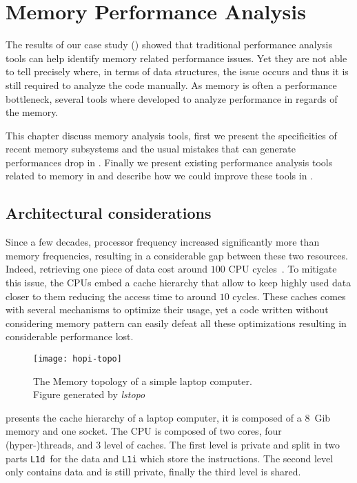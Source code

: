 \chapter{Memory Performance Analysis}

The results of our case study () showed that traditional performance analysis tools can help identify memory related performance issues.
Yet they are not able to tell precisely where, in terms of data structures, the issue occurs and thus it is still required to analyze the code manually.
As memory is often a performance bottleneck, several tools where developed to analyze performance in regards of the memory.

This chapter discuss memory analysis tools, first we present the specificities of recent memory subsystems and the usual mistakes that can generate performances drop in .
Finally we present existing performance analysis tools related to memory in  and describe how we could improve these tools in .

\section{Architectural considerations}
\label{sec:archi}

Since a few decades, processor frequency increased significantly more than memory frequencies, resulting in a considerable gap between these two resources.
Indeed, retrieving one piece of data cost around $100$ \gls{CPU} cycles~\cite{Drepper07What}.
To mitigate this issue, the \glspl{CPU} embed a cache hierarchy that allow to keep highly used data closer to them reducing the access time to around $10$ cycles.
These caches comes with several mechanisms to optimize their usage, yet a code written without considering memory pattern can easily defeat all these optimizations resulting in considerable performance lost.

\begin{figure}[htb]
    \centering
    \texttt{[image: hopi-topo]}
    \caption[Simple cache hierarchy]{The Memory topology of a simple laptop computer.\\
        Figure generated by \emph{lstopo}}
    \label{fig:hopi-topo}
\end{figure}

 presents the cache hierarchy of a laptop computer, it is composed of a \SI{8}{Gib} memory and one socket.
The \gls{CPU} is composed of two cores, four (hyper-)threads, and 3 level of caches.
The first level is private and split in two parts \texttt{L1d} for the data and \texttt{L1i} which store the instructions.
The second level only contains data and is still private, finally the third level is shared.

